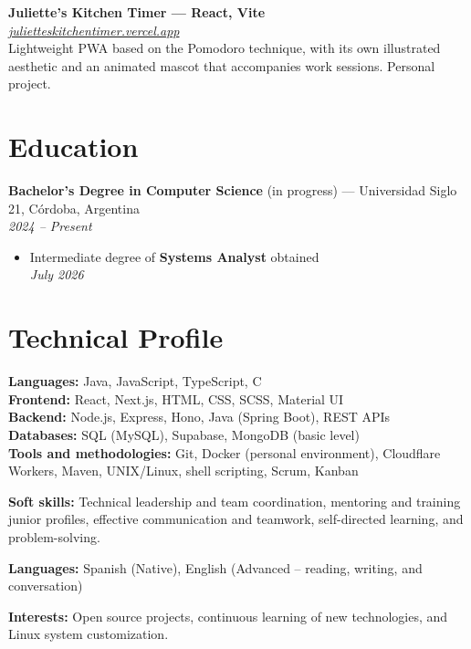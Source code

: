 \documentclass[10pt,a4paper]{article}
\newcommand{\entryheader}[2]{\textbf{#1}\\ \textit{#2}\\[1pt]}
\begin{document}
\vspace{2pt}
\entryheader{Juliette's Kitchen Timer --- React, Vite}{\href{https://julietteskitchentimer.vercel.app/}{julietteskitchentimer.vercel.app}}
Lightweight PWA based on the Pomodoro technique, with its own illustrated aesthetic and an animated mascot that accompanies work sessions. Personal project.

\section*{Education}
\textbf{Bachelor's Degree in Computer Science} (in progress) --- Universidad Siglo 21, Córdoba, Argentina\\
\textit{2024 -- Present}
\begin{itemize}
    \item Intermediate degree of \textbf{Systems Analyst} obtained\\
    \textit{July 2026}
\end{itemize}

\section*{Technical Profile}

\textbf{Languages:} Java, JavaScript, TypeScript, C\\
\textbf{Frontend:} React, Next.js, HTML, CSS, SCSS, Material UI\\
\textbf{Backend:} Node.js, Express, Hono, Java (Spring Boot), REST APIs\\
\textbf{Databases:} SQL (MySQL), Supabase, MongoDB (basic level)\\
\textbf{Tools and methodologies:} Git, Docker (personal environment), Cloudflare Workers, Maven, UNIX/Linux, shell scripting, Scrum, Kanban

\vspace{1.5pt}
\textbf{Soft skills:} Technical leadership and team coordination, mentoring and training junior profiles, effective communication and teamwork, self-directed learning, and problem-solving.

\vspace{1.5pt}
\textbf{Languages:} Spanish (Native), English (Advanced -- reading, writing, and conversation)

\vspace{1.5pt}
\textbf{Interests:} Open source projects, continuous learning of new technologies, and Linux system customization.
\end{document}
